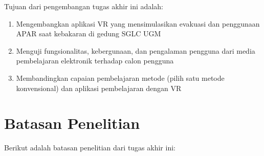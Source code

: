 %
%
%


Tujuan dari pengembangan tugas akhir ini adalah:
\begin{enumerate}
	\item Mengembangkan aplikasi VR yang mensimulasikan evakuasi dan penggunaan APAR saat kebakaran di gedung SGLC UGM
	\item Menguji fungsionalitas, kebergunaan, dan pengalaman pengguna dari media pembelajaran elektronik terhadap calon pengguna
	\item Membandingkan capaian pembelajaran metode (pilih satu metode konvensional) dan aplikasi pembelajaran dengan VR
\end{enumerate}




\section{Batasan Penelitian}

Berikut adalah batasan penelitian dari tugas akhir ini:

